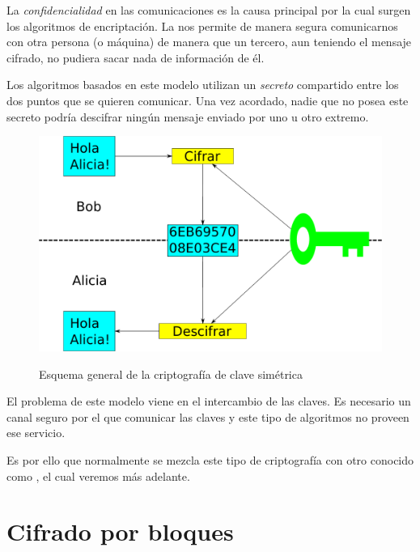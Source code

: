  La \emph{confidencialidad} en las comunicaciones es la causa principal por la cual surgen los algoritmos de encriptación.
 La  nos permite de manera segura comunicarnos con otra persona (o máquina) de manera que un tercero,
 aun teniendo el mensaje cifrado, no pudiera sacar nada de información de él.

 Los algoritmos basados en este modelo utilizan un \emph{secreto} compartido entre los dos puntos que se quieren comunicar.
 Una vez acordado, nadie que no posea este secreto podría descifrar ningún mensaje enviado por uno u otro extremo.

 \begin{figure}[ht]
   \centering
   \includegraphics[scale=0.5]{Figures/SymmetricKeyEncryption}
   \decoRule
   \caption[Criptografía de clave simétrica (Esquema)]{Esquema general de la criptografía de clave simétrica} \emph{\parencite{Reference20}}
   \label{fig:SymmetricKeyEncryption}
 \end{figure}

 El problema de este modelo viene en el intercambio de las claves.
 Es necesario un canal seguro por el que comunicar las claves y este tipo de algoritmos no proveen ese servicio. \emph{\parencite{Reference19}}

 Es por ello que normalmente se mezcla este tipo de criptografía con otro conocido como , el cual veremos más adelante.


 \section{Cifrado por bloques}

